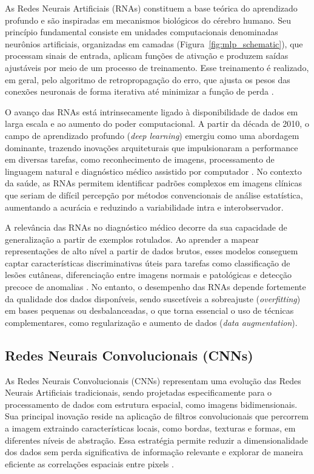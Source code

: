 As Redes Neurais Artificiais (RNAs) constituem a base teórica do aprendizado profundo e são inspiradas em mecanismos biológicos do cérebro humano. Seu princípio fundamental consiste em unidades computacionais denominadas neurônios artificiais, organizadas em camadas (Figura~\ref{fig:mlp_schematic}), que processam sinais de entrada, aplicam funções de ativação e produzem saídas ajustáveis por meio de um processo de treinamento. Esse treinamento é realizado, em geral, pelo algoritmo de retropropagação do erro, que ajusta os pesos das conexões neuronais de forma iterativa até minimizar a função de perda \cite{rumelhart1986learning}.

O avanço das RNAs está intrinsecamente ligado à disponibilidade de dados em larga escala e ao aumento do poder computacional. A partir da década de 2010, o campo de aprendizado profundo (\textit{deep learning}) emergiu como uma abordagem dominante, trazendo inovações arquiteturais que impulsionaram a performance em diversas tarefas, como reconhecimento de imagens, processamento de linguagem natural e diagnóstico médico assistido por computador \cite{lecun2015deep, schmidhuber2015deep}. No contexto da saúde, as RNAs permitem identificar padrões complexos em imagens clínicas que seriam de difícil percepção por métodos convencionais de análise estatística, aumentando a acurácia e reduzindo a variabilidade intra e interobservador.

A relevância das RNAs no diagnóstico médico decorre da sua capacidade de generalização a partir de exemplos rotulados. Ao aprender a mapear representações de alto nível a partir de dados brutos, esses modelos conseguem captar características discriminativas úteis para tarefas como classificação de lesões cutâneas, diferenciação entre imagens normais e patológicas e detecção precoce de anomalias \cite{goodfellow2016deep}. No entanto, o desempenho das RNAs depende fortemente da qualidade dos dados disponíveis, sendo suscetíveis a sobreajuste (\textit{overfitting}) em bases pequenas ou desbalanceadas, o que torna essencial o uso de técnicas complementares, como regularização e aumento de dados (\textit{data augmentation}).


\subsection{Redes Neurais Convolucionais (CNNs)}

As Redes Neurais Convolucionais (CNNs) representam uma evolução das Redes Neurais Artificiais tradicionais, sendo projetadas especificamente para o processamento de dados com estrutura espacial, como imagens bidimensionais. Sua principal inovação reside na aplicação de filtros convolucionais que percorrem a imagem extraindo características locais,  como bordas, texturas e formas,  em diferentes níveis de abstração. Essa estratégia permite reduzir a dimensionalidade dos dados sem perda significativa de informação relevante e explorar de maneira eficiente as correlações espaciais entre pixels \cite{lecun1998gradient}.

